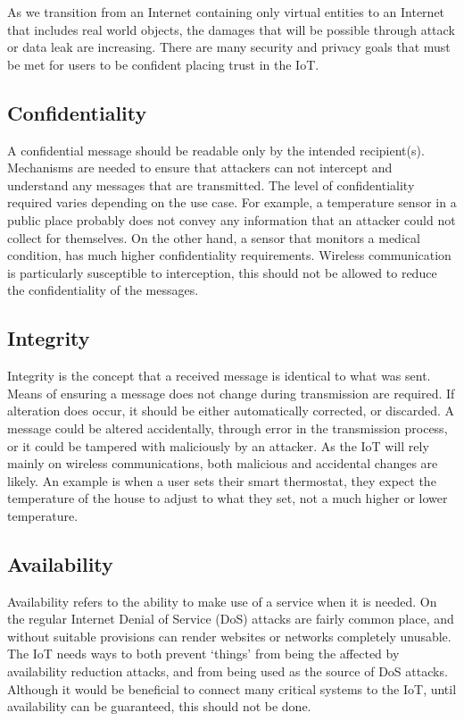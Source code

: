 \documentclass[10pt,journal,compsoc]{IEEEtran}
\begin{document}
As we transition from an Internet containing only virtual entities to an
Internet that includes real world objects, the damages that will be possible
through attack or data leak are increasing. There are many security and privacy
goals that must be met for users to be confident placing trust in the IoT.

\subsection{Confidentiality}
A confidential message should be readable only by the intended recipient(s).
Mechanisms are needed to ensure that attackers can not intercept and understand
any messages that are transmitted. The level of confidentiality required varies
depending on the use case. For example, a temperature sensor in a public place
probably does not convey any information that an attacker could not collect for
themselves. On the other hand, a sensor that monitors a medical condition, has
much higher confidentiality requirements. Wireless communication is
particularly susceptible to interception, this should not be allowed to reduce
the confidentiality of the messages.  

\subsection{Integrity}
Integrity is the concept that a received message is identical to what was sent.
Means of ensuring a message does not change during transmission are required.
If alteration does occur, it should be either automatically corrected, or
discarded. A message could be altered accidentally, through error in the
transmission process, or it could be tampered with maliciously by an attacker.
As the IoT will rely mainly on wireless communications, both malicious and
accidental changes are likely. An example is when a user sets their smart
thermostat, they expect the temperature of the house to adjust to what they
set, not a much higher or lower temperature.  

\subsection{Availability}
Availability refers to the ability to make use of a service when it is needed.
On the regular Internet Denial of Service (DoS) attacks are fairly common
place, and without suitable provisions can render websites or networks
completely unusable. The IoT needs ways to both prevent `things' from being the
affected by availability reduction attacks, and from being used as the source of DoS
attacks. Although it would be beneficial to connect many critical systems to
the IoT, until availability can be guaranteed, this should not be done.
\end{document}
